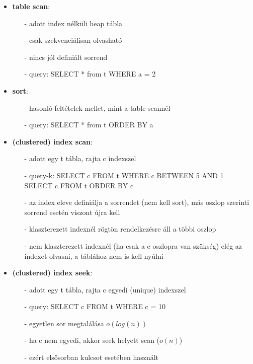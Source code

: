 \documentclass[12pt]{article}
\theoremstyle{plain}
\begin{document}
\begin{itemize}

    \item \textbf{table scan}: 
        \begin{itemize}
            \item[-] adott index nélküli heap tábla
            \item[-] csak szekvenciálisan olvasható
            \item[-] nincs jól definiált sorrend
            \item[-] query: SELECT * from t WHERE a = 2
        \end{itemize}{}
    
    \item \textbf{sort}: 
        \begin{itemize}
            \item[-] hasonló feltételek mellet, mint a table scannél
            \item[-] query: SELECT * from t ORDER BY a
        \end{itemize}{}
        
    \item \textbf{(clustered) index scan}:
        \begin{itemize}
            \item[-] adott egy t tábla, rajta c indexszel
            \item[-] query-k: SELECT c FROM t WHERE c BETWEEN 5 AND 1 \\ SELECT c FROM t ORDER BY c 
            \item[-] az index eleve definiálja a sorrendet (nem kell sort), más oszlop szerinti sorrend esetén viszont újra kell
            \item[-] klaszterezett indexnél rögtön rendelkezésre áll a többi oszlop
            \item[-] nem klaszterezett indexnél (ha csak a c oszlopra van szükség) elég az indexet olvasni, a táblához nem is kell nyúlni
        \end{itemize}{}
        
    \item \textbf{(clustered) index seek}:
        \begin{itemize}
            \item[-] adott egy t tábla, rajta c egyedi (unique) indexszel
            \item[-] query: SELECT c FROM t WHERE c = 10
            \item[-] egyetlen sor megtalálása $o(log(n))$
            \item[-] ha c nem egyedi, akkor seek helyett scan ($o(n)$)
            \item[-] ezért elsősorban kulcsot esetében használt
        \end{itemize}{}
        

\end{itemize}
\end{document}
